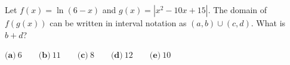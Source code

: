 Let $f(x)=\ln(6-x)$ and $g(x)=\left|x^2-10x+15\right|$. The domain of $f(g(x))$ can be written in interval notation as $(a,b)\cup(c,d)$. What is $b+d$?

$\textbf{(a)}\ 6\qquad\textbf{(b)}\ 11\qquad\textbf{(c)}\ 8\qquad\textbf{(d)}\ 12\qquad\textbf{(e)}\ 10$
